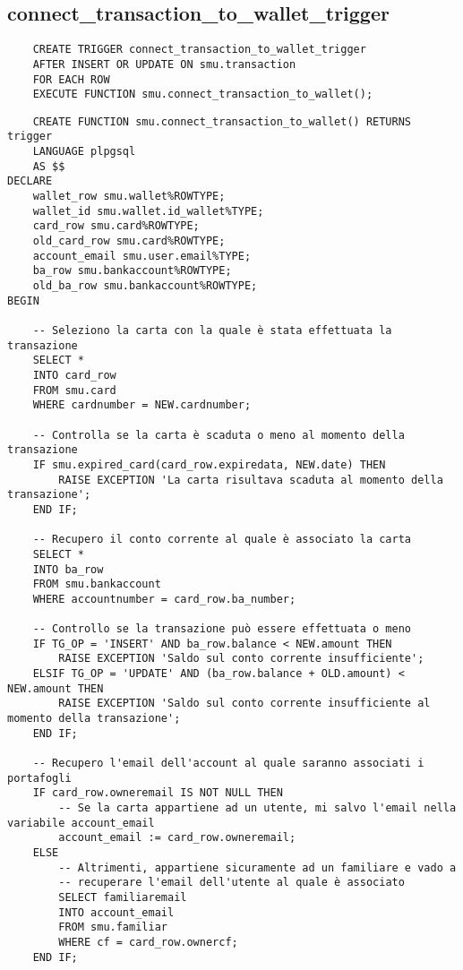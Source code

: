 \subsection{connect\_transaction\_to\_wallet\_trigger}

\begin{lstlisting}
    CREATE TRIGGER connect_transaction_to_wallet_trigger 
    AFTER INSERT OR UPDATE ON smu.transaction 
    FOR EACH ROW 
    EXECUTE FUNCTION smu.connect_transaction_to_wallet();
\end{lstlisting}

\begin{lstlisting}
    CREATE FUNCTION smu.connect_transaction_to_wallet() RETURNS trigger
    LANGUAGE plpgsql
    AS $$
DECLARE
    wallet_row smu.wallet%ROWTYPE;
    wallet_id smu.wallet.id_wallet%TYPE;
    card_row smu.card%ROWTYPE;
    old_card_row smu.card%ROWTYPE;
    account_email smu.user.email%TYPE;
    ba_row smu.bankaccount%ROWTYPE;
    old_ba_row smu.bankaccount%ROWTYPE;
BEGIN

    -- Seleziono la carta con la quale è stata effettuata la transazione
    SELECT *
    INTO card_row
    FROM smu.card
    WHERE cardnumber = NEW.cardnumber;

    -- Controlla se la carta è scaduta o meno al momento della transazione
    IF smu.expired_card(card_row.expiredata, NEW.date) THEN
        RAISE EXCEPTION 'La carta risultava scaduta al momento della transazione';
    END IF;

    -- Recupero il conto corrente al quale è associato la carta
    SELECT *
    INTO ba_row
    FROM smu.bankaccount
    WHERE accountnumber = card_row.ba_number;
    
    -- Controllo se la transazione può essere effettuata o meno
    IF TG_OP = 'INSERT' AND ba_row.balance < NEW.amount THEN
        RAISE EXCEPTION 'Saldo sul conto corrente insufficiente';
    ELSIF TG_OP = 'UPDATE' AND (ba_row.balance + OLD.amount) < NEW.amount THEN
        RAISE EXCEPTION 'Saldo sul conto corrente insufficiente al momento della transazione';
    END IF;

    -- Recupero l'email dell'account al quale saranno associati i portafogli
    IF card_row.owneremail IS NOT NULL THEN
        -- Se la carta appartiene ad un utente, mi salvo l'email nella variabile account_email
        account_email := card_row.owneremail;
    ELSE
        -- Altrimenti, appartiene sicuramente ad un familiare e vado a
        -- recuperare l'email dell'utente al quale è associato
        SELECT familiaremail
        INTO account_email
        FROM smu.familiar
        WHERE cf = card_row.ownercf;
    END IF;


\end{lstlisting}
